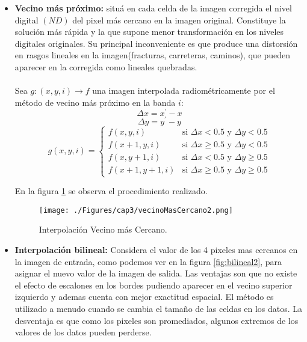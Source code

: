 	\begin{itemize}
		\item \textbf{Vecino m\'as pr\'oximo:} situ\'a en cada celda de la imagen corregida el nivel digital $ (ND) $ del pixel m\'as cercano en la imagen original. Constituye la soluci\'on m\'as r\'apida y la que supone menor transformaci\'on en los niveles digitales originales. Su principal inconveniente es que produce una distorsi\'on en rasgos lineales en la imagen(fracturas, carreteras, caminos), que pueden aparecer en la corregida como lineales quebradas. \\~\\
		Sea $ g:(x,y,i) \longrightarrow f$ una imagen interpolada radiom\'etricamente por el m\'etodo de vecino m\'as pr\'oximo en la banda $ i $:
		\begin{equation}
		\Delta x = x^{'}-x
		\end{equation}	
		\begin{equation}
		\Delta y = y^{'}-y
		\end{equation}	
\begin{equation}
	g(x,y,i) = \begin{cases}
		f(x,y,i) & \text{si }\Delta x < 0.5 \text{ y } \Delta y < 0.5\\
		f(x+1,y,i) & \text{si } \Delta x \geq 0.5 \text{ y } \Delta y < 0.5\\
		f(x,y+1,i) & \text{si } \Delta x < 0.5 \text{ y } \Delta y \geq 0.5\\
		f(x+1,y+1,i) & \text{si } \Delta x \geq 0.5 \text{ y } \Delta y \geq 0.5
	\end{cases}
\end{equation}	

En la figura \ref{fig:vecinoMasCercano2} se observa el procedimiento realizado.
				    \begin{figure}[H]
				    	\centering
				    	\texttt{[image: ./Figures/cap3/vecinoMasCercano2.png]}
				    	\caption{Interpolaci\'on Vecino m\'as Cercano.}
				    	\label{fig:vecinoMasCercano2}
				    \end{figure}
		
		\item \textbf{Interpolaci\'on bilineal:} Considera el valor de los 4 pixeles mas cercanos en la imagen de entrada, como podemos ver en la figura \ref{fig:bilineal2}, para asignar el nuevo valor de la imagen de salida. Las ventajas son que no existe el efecto de escalones en los bordes pudiendo aparecer en el vecino superior izquierdo y ademas cuenta con mejor exactitud espacial. El m\'etodo es utilizado a menudo cuando se cambia el tama\~{n}o de las celdas en los datos. La desventaja es que como los pixeles son promediados, algunos extremos de los valores de los datos pueden perderse.\\~\\
		

\end{itemize}
